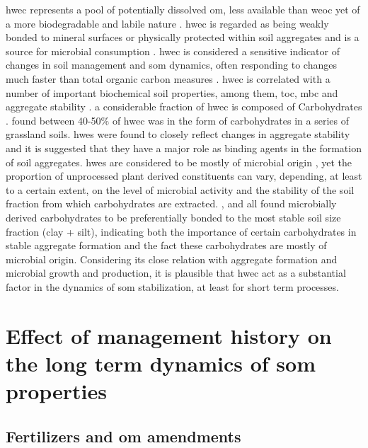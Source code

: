 	\gls{hwec} represents a pool of potentially dissolved \gls{om}, less available than \gls{weoc} yet of a more biodegradable and labile nature \citep{chantigny2014, leinweber1995, gregorich2003}. \gls{hwec} is regarded as being weakly bonded to mineral surfaces or physically protected within soil aggregates and is a source for microbial consumption \citep{zakharova2015, leinweber1995}.
	\gls{hwec} is considered a  sensitive indicator of changes in soil management and \gls{som} dynamics, often responding to changes much faster than total organic carbon measures \citep{ghani2003}. \gls{hwec} is correlated with a number of important biochemical soil properties, among them, \gls{toc}, \gls{mbc} and aggregate stability \citep{hamkalo2014}.
	a considerable fraction of \gls{hwec} is composed of Carbohydrates \citep{leinweber1995, balaria2009}. \citet{ghani2003} found between 40-50\% of \gls{hwec} was in the form of carbohydrates in a series of grassland soils.
	\gls{hwes} were found to  closely reflect changes in aggregate stability \citep{haynes2005, yousefi2008, leguillou2012} and it is suggested that they have a major role as binding agents in the formation of soil aggregates.
	\gls{hwes} are considered to be mostly of microbial origin \citep{haynes1993, debosz2002}, yet the proportion of unprocessed plant derived constituents can vary, depending, at least to a certain extent, on the level of microbial activity and the stability of the soil fraction from which carbohydrates are extracted. \citet{puget1998}, \citet{jolivet2006} and \citet{bock2007} all found microbially derived carbohydrates to be preferentially bonded to the most stable soil size fraction (clay + silt), indicating both the importance of certain  carbohydrates in stable aggregate formation and the fact these carbohydrates are mostly of microbial origin.
	Considering its close relation with aggregate formation and microbial growth and production, it is plausible that \gls{hwec} act as a substantial factor in  the dynamics of \gls{som} stabilization, at least for short term processes.

\section{Effect of management history on the long term dynamics of \gls{som} properties}

 	\subsection{Fertilizers and \gls{om} amendments}

